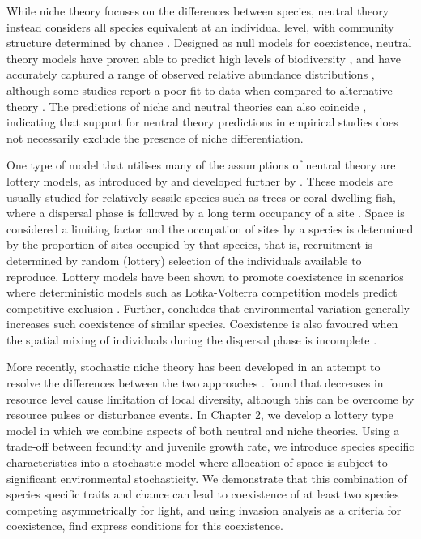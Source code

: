 While niche theory focuses on the differences between species, neutral theory instead considers all species equivalent at an individual level, with community structure determined by chance \citep[e.g.][]{hubbell1979tree,chave2004neutral,hubbell2001unified}. Designed as null models for coexistence, neutral theory models have proven able to predict high levels of biodiversity \citep[see ][ and references therein]{chave2004neutral,hubbell2001unified}, and have accurately captured a range of observed relative abundance distributions \citep[e.g.][]{volkov2003neutral}, although some studies report a poor fit to data when compared to alternative theory \citep[e.g.][]{dornelas2006coral,mcgill2006empirical}. The predictions of niche and neutral theories can also coincide \citep{chisholm2010niche}, indicating that support for neutral theory predictions in empirical studies does not necessarily exclude the presence of niche differentiation.
 
One type of model that utilises many of the assumptions of neutral theory are lottery models, as introduced by \cite{sale1978coexistence} and developed further by \cite{chesson1981environmental}. These models are usually studied for relatively sessile species such as trees or coral dwelling fish, where a dispersal phase is followed by a long term occupancy of a site \citep[e.g.][]{munday2004competitive}. Space is considered a limiting factor and the occupation of sites by a species is determined by the proportion of sites occupied by that species, that is, recruitment is determined by random (lottery) selection of the individuals available to reproduce. Lottery models have been shown to promote coexistence in scenarios where deterministic models such as Lotka-Volterra competition models predict competitive exclusion \citep[e.g.][]{chesson2000mechanisms}. Further, \cite{fagerstrom1988lotteries} concludes that environmental variation generally increases such coexistence of similar species. Coexistence is also favoured when the spatial mixing of individuals during the dispersal phase is incomplete \citep{muko2003incomplete,snyder2003local}.

More recently, stochastic niche theory has been developed in an attempt to resolve the differences between the two approaches \citep{tilman2004niche}. \citep{tilman2004niche} found that decreases in resource level cause limitation of local diversity, although this can be overcome by resource pulses or disturbance events. In Chapter 2, we develop a lottery type model in which we combine aspects of both neutral and niche theories. Using a trade-off between fecundity and juvenile growth rate, we introduce species specific characteristics into a stochastic model where  allocation of space is subject to significant environmental stochasticity. We demonstrate that this combination of species specific traits and chance can lead to coexistence of at least two species competing asymmetrically for light, and using invasion analysis as a criteria for coexistence, find express conditions for this coexistence. 

